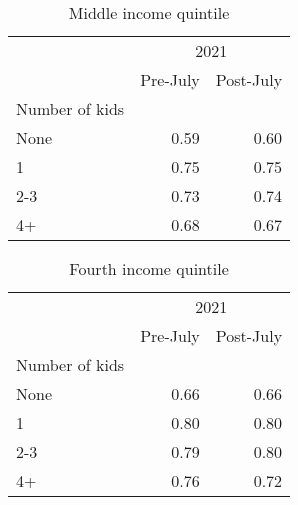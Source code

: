 \documentclass{article}
\begin{document}
	\begin{table}[!h]
		\centering
	\caption{Middle income quintile}
	\begin{tabular}{lll}
		\cline{1-3}
		\multicolumn{1}{c}{} &
		\multicolumn{2}{|c}{2021} \\
		\multicolumn{1}{c}{} &
		\multicolumn{1}{|r}{Pre-July} &
		\multicolumn{1}{r}{Post-July} \\
		\cline{1-3}
		\multicolumn{1}{l}{Number of kids} &
		\multicolumn{1}{|r}{} &
		\multicolumn{1}{r}{} \\
		\multicolumn{1}{l}{\hspace{1em}None} &
		\multicolumn{1}{|r}{0.59} &
		\multicolumn{1}{r}{0.60} \\
		\multicolumn{1}{l}{\hspace{1em}1} &
		\multicolumn{1}{|r}{0.75} &
		\multicolumn{1}{r}{0.75} \\
		\multicolumn{1}{l}{\hspace{1em}2-3} &
		\multicolumn{1}{|r}{0.73} &
		\multicolumn{1}{r}{0.74} \\
		\multicolumn{1}{l}{\hspace{1em}4+} &
		\multicolumn{1}{|r}{0.68} &
		\multicolumn{1}{r}{0.67} \\
		\cline{1-3}
	\end{tabular}
\end{table}

\begin{table}[!h]
	\centering
	\caption{Fourth income quintile}
\begin{tabular}{lll}
	\cline{1-3}
	\multicolumn{1}{c}{} &
	\multicolumn{2}{|c}{2021} \\
	\multicolumn{1}{c}{} &
	\multicolumn{1}{|r}{Pre-July} &
	\multicolumn{1}{r}{Post-July} \\
	\cline{1-3}
	\multicolumn{1}{l}{Number of kids} &
	\multicolumn{1}{|r}{} &
	\multicolumn{1}{r}{} \\
	\multicolumn{1}{l}{\hspace{1em}None} &
	\multicolumn{1}{|r}{0.66} &
	\multicolumn{1}{r}{0.66} \\
	\multicolumn{1}{l}{\hspace{1em}1} &
	\multicolumn{1}{|r}{0.80} &
	\multicolumn{1}{r}{0.80} \\
	\multicolumn{1}{l}{\hspace{1em}2-3} &
	\multicolumn{1}{|r}{0.79} &
	\multicolumn{1}{r}{0.80} \\
	\multicolumn{1}{l}{\hspace{1em}4+} &
	\multicolumn{1}{|r}{0.76} &
	\multicolumn{1}{r}{0.72} \\
	\cline{1-3}
\end{tabular}
\end{table}
\end{document}
